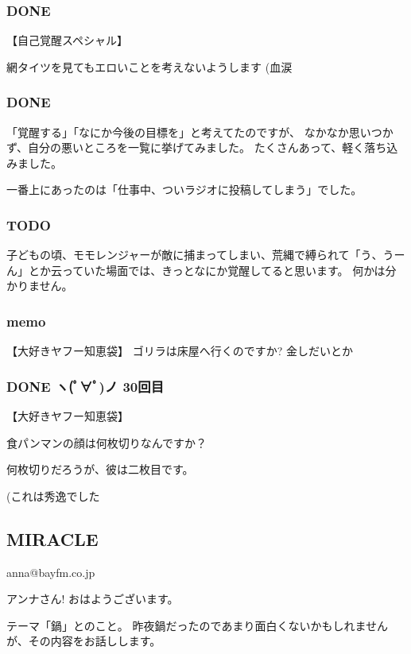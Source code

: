 \documentclass[11pt]{article}
\begin{document}
\subsubsection{\textbf{DONE}}
\label{sec-32_1_2}

【自己覚醒スペシャル】

網タイツを見てもエロいことを考えないようします (血涙
\subsubsection{\textbf{DONE}}
\label{sec-32_1_3}

「覚醒する」「なにか今後の目標を」と考えてたのですが、
なかなか思いつかず、自分の悪いところを一覧に挙げてみました。
たくさんあって、軽く落ち込みました。

一番上にあったのは「仕事中、ついラジオに投稿してしまう」でした。
\subsubsection{\textbf{TODO}}
\label{sec-32_1_4}

子どもの頃、モモレンジャーが敵に捕まってしまい、荒縄で縛られて「う、うーん」とか云っていた場面では、きっとなにか覚醒してると思います。
何かは分かりません。
\subsubsection{memo}
\label{sec-32_1_5}

【大好きヤフー知恵袋】
ゴリラは床屋へ行くのですか?
金しだいとか
\subsubsection{\textbf{DONE} ヽ(ﾟ∀ﾟ)ノ 30回目}
\label{sec-32_1_6}

【大好きヤフー知恵袋】

食パンマンの顔は何枚切りなんですか？

何枚切りだろうが、彼は二枚目です。

(これは秀逸でした
\subsection{MIRACLE}
\label{sec-32_2}

anna@bayfm.co.jp

アンナさん! おはようございます。

テーマ「鍋」とのこと。
昨夜鍋だったのであまり面白くないかもしれませんが、その内容をお話しします。
\end{document}
